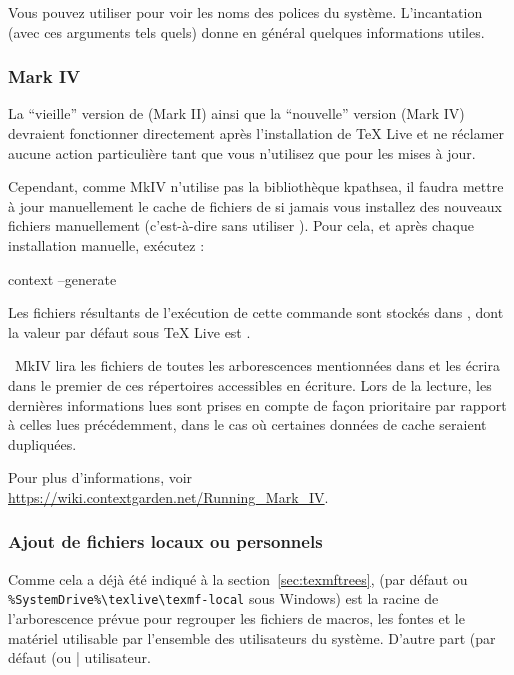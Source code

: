\documentclass[german, english, french]{article}
\renewcommand{\TL}{\TeX{} Live\xspace}%
\begin{document}
Vous pouvez utiliser  pour voir les noms des polices du système.
L'incantation  (avec ces arguments
tels quels) donne en général quelques informations utiles.

\subsubsection{\protect\ConTeXt{} Mark IV}
\label{sec:context-mkiv}

La \enquote{vieille} version de \ConTeXt{} (Mark II) ainsi que la
\enquote{nouvelle} version (Mark IV) devraient fonctionner directement après
l'installation de \TL et ne réclamer aucune action particulière tant que vous
n'utilisez que  pour les mises à jour.

Cependant, comme \ConTeXt{} MkIV n'utilise pas la bibliothèque kpathsea, il
faudra mettre à jour manuellement le cache de fichiers de \ConTeXt{} si jamais
vous installez des nouveaux fichiers manuellement (c'est-à-dire sans utiliser
). Pour cela, et après chaque installation manuelle, exécutez :
\begin{sverbatim}
context --generate
\end{sverbatim}
Les fichiers résultants de l'exécution de cette commande sont stockés dans
, dont la valeur par défaut sous \TL{} est
.

\ConTeXt\ MkIV lira les fichiers de toutes les arborescences mentionnées dans
 et les écrira dans le premier de ces répertoires
accessibles en écriture. Lors de la lecture, les dernières informations lues
sont prises en compte de façon prioritaire par rapport à celles lues
précédemment, dans le cas où certaines données de cache seraient dupliquées.

Pour plus d'informations, voir
\url{https://wiki.contextgarden.net/Running_Mark_IV}.


\subsubsection{Ajout de fichiers locaux ou personnels}
\label{sec:local-personal-macros}

Comme cela a déjà été indiqué à la section~\ref{sec:texmftrees},
 (par défaut  ou
\verb|%SystemDrive%\texlive\texmf-local| sous Windows) est la racine de
l'arborescence prévue pour regrouper les fichiers de macros, les fontes et le
matériel utilisable par l'ensemble des utilisateurs du système.  D'autre part
 (par défaut  %
(ou |%
utilisateur.
\end{document}
